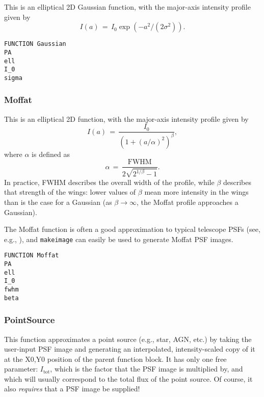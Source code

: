 \documentclass[10pt,a4paper,article]{memoir}
\newcommand{\makeimage}{\texttt{makeimage}}
\begin{document}
This is an elliptical 2D Gaussian function, with the major-axis intensity
profile given by
\begin{equation}
I(a) \, = \, I_{0} \exp(-a^2/(2 \sigma^2)).
\end{equation}

\begin{verbatim}
FUNCTION Gaussian
PA
ell
I_0
sigma
\end{verbatim}


\subsubsection{Moffat}

This is an elliptical 2D \citet{moffat69} function, with the major-axis intensity profile
given by
\begin{equation}
I(a) \, = \, \frac{I_{0}  }{(1 + (a/\alpha)^{2})^{\beta} },
\end{equation}
where $\alpha$ is defined as
\begin{equation}
\alpha \, = \, \frac{ {\mathrm{FWHM}}}{2 \sqrt{2^{1/\beta} - 1}}.
\end{equation}
In practice, FWHM describes the overall width of the profile, while $\beta$ describes that
strength of the wings: lower values of $\beta$ mean more intensity in the wings
than is the case for a Gaussian (as $\beta \rightarrow \infty$, the Moffat profile
approaches a Gaussian).

The Moffat function is often a good approximation to typical telescope PSFs (see, e.g.,
\citealt{trujillo01}), and \makeimage{} can easily be used to generate Moffat PSF images.

\begin{verbatim}
FUNCTION Moffat
PA
ell
I_0
fwhm
beta
\end{verbatim}


%


\subsubsection{PointSource}

This function approximates a point source (e.g., star, AGN, etc.) by
taking the user-input PSF image and generating an interpolated,
intensity-scaled copy of it at the X0,Y0 position of the parent function
block. It has only one free parameter: $I_{\mathrm{tot}}$, which is the
factor that the PSF image is multiplied by, and which will usually
correspond to the total flux of the point source. Of course, it also
\textit{requires} that a PSF image be supplied!
\end{document}
